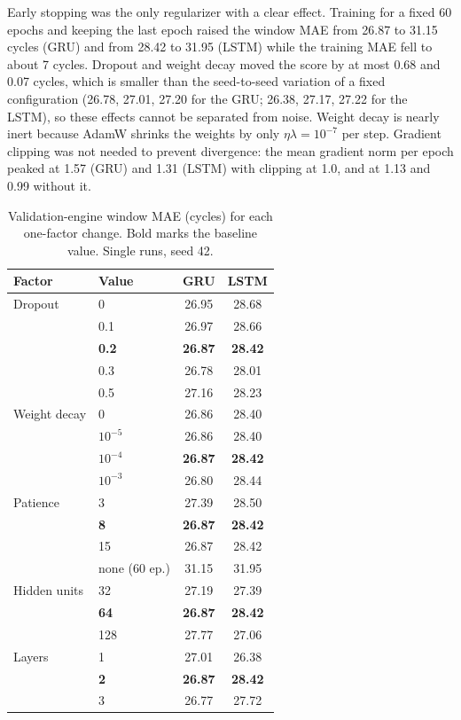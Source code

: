 Early stopping was the only regularizer with a clear effect.  Training for a fixed 60 epochs and keeping the last epoch raised the window MAE from 26.87 to 31.15 cycles (GRU) and from 28.42 to 31.95 (LSTM) while the training MAE fell to about 7 cycles.  Dropout and weight decay moved the score by at most 0.68 and 0.07 cycles, which is smaller than the seed-to-seed variation of a fixed configuration (26.78, 27.01, 27.20 for the GRU; 26.38, 27.17, 27.22 for the LSTM), so these effects cannot be separated from noise.  Weight decay is nearly inert because AdamW shrinks the weights by only $\eta\lambda=10^{-7}$ per step.  Gradient clipping was not needed to prevent divergence: the mean gradient norm per epoch peaked at 1.57 (GRU) and 1.31 (LSTM) with clipping at 1.0, and at 1.13 and 0.99 without it.

\begin{table}[t]
\centering
\caption{Validation-engine window MAE (cycles) for each one-factor change. Bold marks the baseline value. Single runs, seed 42.}
\label{tab:reg}
\footnotesize
\begin{tabular}{llcc}
\toprule
Factor & Value & GRU & LSTM\\
\midrule
Dropout & 0 & 26.95 & 28.68\\
 & 0.1 & 26.97 & 28.66\\
 & \textbf{0.2} & \textbf{26.87} & \textbf{28.42}\\
 & 0.3 & 26.78 & 28.01\\
 & 0.5 & 27.16 & 28.23\\
\midrule
Weight decay & 0 & 26.86 & 28.40\\
 & $10^{-5}$ & 26.86 & 28.40\\
 & \textbf{$10^{-4}$} & \textbf{26.87} & \textbf{28.42}\\
 & $10^{-3}$ & 26.80 & 28.44\\
\midrule
Patience & 3 & 27.39 & 28.50\\
 & \textbf{8} & \textbf{26.87} & \textbf{28.42}\\
 & 15 & 26.87 & 28.42\\
 & none (60 ep.) & 31.15 & 31.95\\
\midrule
Hidden units & 32 & 27.19 & 27.39\\
 & \textbf{64} & \textbf{26.87} & \textbf{28.42}\\
 & 128 & 27.77 & 27.06\\
\midrule
Layers & 1 & 27.01 & 26.38\\
 & \textbf{2} & \textbf{26.87} & \textbf{28.42}\\
 & 3 & 26.77 & 27.72\\
\bottomrule
\end{tabular}
\end{table}

